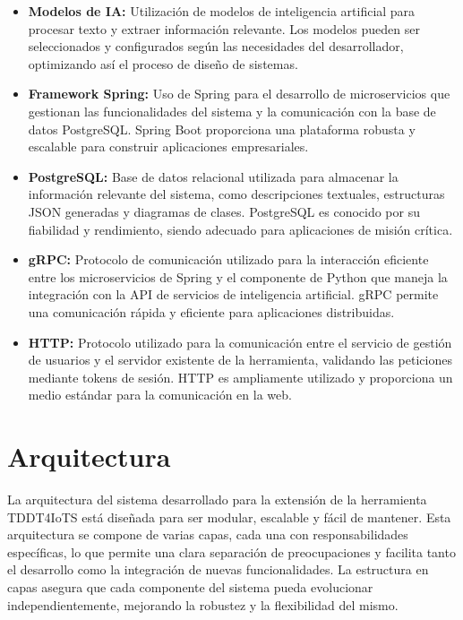 \begin{itemize}
	\item \textbf{Modelos de IA:}
	Utilización de modelos de inteligencia artificial para procesar texto y extraer información relevante. Los modelos pueden ser seleccionados y configurados según las necesidades del desarrollador, optimizando así el proceso de diseño de sistemas.
	
	\item \textbf{Framework Spring:}
	Uso de Spring para el desarrollo de microservicios que gestionan las funcionalidades del sistema y la comunicación con la base de datos PostgreSQL. Spring Boot proporciona una plataforma robusta y escalable para construir aplicaciones empresariales.
	
	\item \textbf{PostgreSQL:}
	Base de datos relacional utilizada para almacenar la información relevante del sistema, como descripciones textuales, estructuras JSON generadas y diagramas de clases. PostgreSQL es conocido por su fiabilidad y rendimiento, siendo adecuado para aplicaciones de misión crítica.
	
	\item \textbf{gRPC:}
	Protocolo de comunicación utilizado para la interacción eficiente entre los microservicios de Spring y el componente de Python que maneja la integración con la API de servicios de inteligencia artificial. gRPC permite una comunicación rápida y eficiente para aplicaciones distribuidas.
	
	\item \textbf{HTTP:}
	Protocolo utilizado para la comunicación entre el servicio de gestión de usuarios y el servidor existente de la herramienta, validando las peticiones mediante tokens de sesión. HTTP es ampliamente utilizado y proporciona un medio estándar para la comunicación en la web.
\end{itemize}

\section{Arquitectura}

La arquitectura del sistema desarrollado para la extensión de la herramienta TDDT4IoTS está diseñada para ser modular, escalable y fácil de mantener. Esta arquitectura se compone de varias capas, cada una con responsabilidades específicas, lo que permite una clara separación de preocupaciones y facilita tanto el desarrollo como la integración de nuevas funcionalidades. La estructura en capas asegura que cada componente del sistema pueda evolucionar independientemente, mejorando la robustez y la flexibilidad del mismo.

